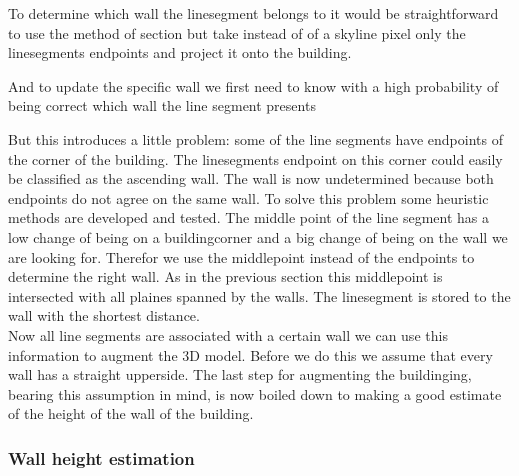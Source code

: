 
	To determine which wall the linesegment belongs to it would be straightforward to use the method of section %
	but take instead of of a skyline pixel only the linesegments endpoints and project it onto the building.

	And to update the specific wall we first need to know with a high probability of being correct which wall the line segment presents
	
	But this introduces a little problem: some of the line segments have endpoints of the corner of the building.
	The linesegments endpoint on this corner could easily be classified as the ascending wall.
	The wall is now undetermined because both endpoints do not agree on the same wall.  
	To solve this problem some heuristic methods are developed and tested.
	The middle point of the line segment has a low change of being on a buildingcorner and a big change of being on the wall we are looking for.
	Therefor we use the middlepoint instead of the endpoints to determine the right wall.
	As in the previous section %
	this middlepoint is intersected with all plaines spanned by the walls. The linesegment is stored to the wall with the shortest distance.
	\\
	Now all line segments are associated with a certain wall we can use this information to augment the 3D model.
	Before we do this we assume that every wall has a straight upperside. %
	The last step for augmenting the buildinging, bearing this assumption in mind, is now boiled down to making a good estimate of the height of the wall of the building.

	


\subsubsection{Wall height estimation}


